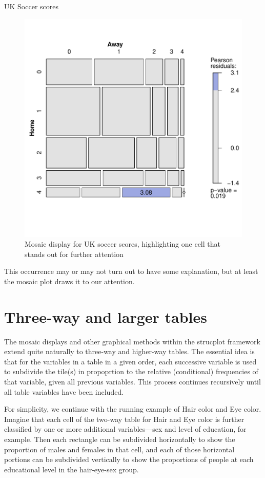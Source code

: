 \documentclass[11pt]{book}\usepackage[]{graphicx}\usepackage[]{color}
\newenvironment{knitrout}{}{} %
\renewenvironment{knitrout}{\small\renewcommand{\baselinestretch}{.85}}{} %
\begin{document}
\begin{Example}[soccer2]{UK Soccer scores}
\begin{knitrout}
\begin{figure}[htbp]
\centerline{\includegraphics[width=.6\textwidth]{ch05/fig/UKsoccer-mosaic} }

\caption[Mosaic display for UK soccer scores, highlighting one cell that stands out for further attention]{Mosaic display for UK soccer scores, highlighting one cell that stands out for further attention\label{fig:UKsoccer-mosaic}}
\end{figure}


\end{knitrout}

This occurrence may or may not turn out to have some explanation, but at least 
the mosaic plot draws it to our attention.
\end{Example}



\section{Three-way and larger tables}\label{sec:mosaic-threeway}


The mosaic displays and other graphical methods within the strucplot framework
extend quite naturally to three-way and higher-way tables.
The essential idea is that for the variables in a \mway table in a given order,
each successive variable is used to subdivide the tile(s) in propoprtion to
the relative (conditional) frequencies of that variable, given all previous
variables.  This process continues recursively until all table variables
have been included.

For simplicity, we continue with the running example of Hair color and Eye color.
Imagine that each
cell of the two-way table for Hair and Eye color is further
classified by one or more additional variables---sex and level of
education, for example.  Then each rectangle can be subdivided
horizontally to show the proportion of males and females in that
cell, and each of those horizontal portions can be subdivided
vertically to show the proportions of people at each educational
level in the hair-eye-sex group.
\end{document}
